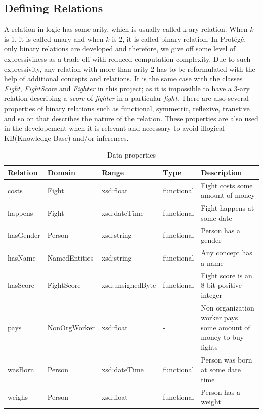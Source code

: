 \documentclass[a4paper]{article}
\begin{document}
\subsection{Defining Relations}
A relation in logic has some arity, which is usually called k-ary relation. When $k$ is 1, it is called unary and when $k$ is 2, it is called binary relation. In Prot\'eg\'e, only binary relations are 
developed and therefore, we give off some level of expressiviness as a trade-off with reduced computation complexity. Due to such expressivity, any relation with more than arity 2 has to be reformulated with the 
help of additional concepts and relations. It is the same case with the classes \textit{Fight}, \textit{FightScore} and \textit{Fighter} in this project; as it is impossible to have a 3-ary relation 
describing a \textit{score} of \textit{fighter} in a particular \textit{fight}. There are also several properties of binary relations such as functional, symmetric, reflexive, transtive and so on 
that describes the nature of the relation. These properties are also used in the developement when it is relevant and necessary to avoid illogical KB(Knowledge Base) and/or inferences.

\begin{table}[H]
	\centering
	\begin{tabular}{|m{}|m{}|m{}|m{}|m{}|}
		\hline
		\textbf{Relation} & \textbf{Domain} & \textbf{Range} & \textbf{Type} & \textbf{Description} \\
		\hline
		costs & Fight & xsd:float & functional & Fight costs some amount of money \\
		\hline
		happens & Fight & xsd:dateTime & functional & Fight happens at some date \\
		\hline
		hasGender & Person & xsd:string & functional & Person has a gender \\
		\hline
		hasName & NamedEntities & xsd:string & functional & Any concept has a name \\
		\hline
		hasScore & FightScore & xsd:unsignedByte & functional & Fight score is an 8 bit positive integer \\
		\hline
		pays & NonOrgWorker & xsd:float & - & Non organization worker pays some amount of money to buy fights \\
		\hline
		wasBorn & Person & xsd:dateTime & functional & Person was born at some date time \\
		\hline
		weighs & Person & xsd:float & functional & Person has a weight \\
		\hline
	\end{tabular}
	\caption{Data properties}
	\label{tab:data_props}
\end{table}
\end{document}

